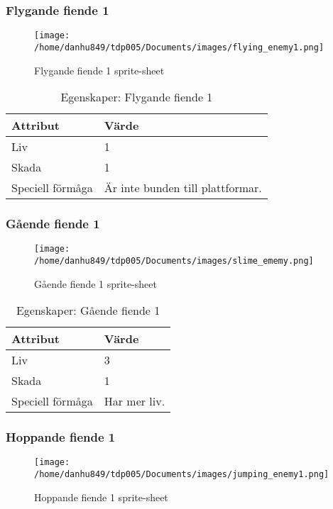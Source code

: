 \documentclass{TDP005mall}
\begin{document}
\subsubsection{Flygande fiende 1}
\begin{figure}[h!]
  \caption{Flygande fiende 1 sprite-sheet\label{fig:1}}
  \centerline{\texttt{[image: /home/danhu849/tdp005/Documents/images/flying\_enemy1.png]}}
\end{figure}

\begin{table}[h!]
  \centering
  \caption{Egenskaper: Flygande fiende 1\label{tab:2}}
\begin{tabular}{|l|l|}
\hline
Attribut & Värde \\\hline
Liv & 1 \\\hline
Skada & 1 \\\hline
Speciell förmåga & Är inte bunden till plattformar. \\\hline
\end{tabular}
\end{table}
\subsubsection{Gående fiende 1}
\begin{figure}[h!]
  \centerline{\texttt{[image: /home/danhu849/tdp005/Documents/images/slime\_ememy.png]}}
  \caption{Gående fiende 1 sprite-sheet\label{fig:2}}
\end{figure}

\begin{table}[h!]
  \centering
  \caption{Egenskaper: Gående fiende 1\label{tab:3}}
\begin{tabular}{|l|l|}
\hline
Attribut & Värde \\\hline
Liv & 3 \\\hline
Skada & 1 \\\hline
Speciell förmåga & Har mer liv. \\\hline
\end{tabular}
\end{table}

\subsubsection{Hoppande fiende 1}
\begin{figure}[h!]
   \caption{Hoppande fiende 1 sprite-sheet\label{fig:3}}
  \centerline{\texttt{[image: /home/danhu849/tdp005/Documents/images/jumping\_enemy1.png]}}
\end{figure}
\end{document}
